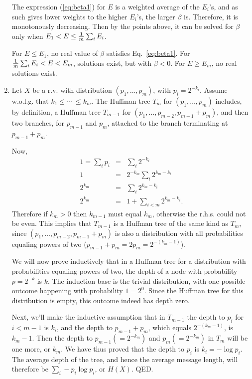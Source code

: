 \documentclass[11pt]{article} \usepackage{amssymb}
\begin{document}
\begin{enumerate}
The expression (\ref{eq:beta1}) for $E$ is a weighted average of the $E_i$'s, and as such
gives lower weights to the higher $E_i$'s, the larger $\beta$ is. Therefore,
it is monotonously decreasing. Then by the points above, it can be 
solved for $\beta$ only when $E_1<E\leq {1\over m}\sum_iE_i$.

For $E\leq E_1$, no real value of $\beta$ satisfies Eq.~\ref{eq:beta1}. 
For ${1\over m}\sum_iE_i<E<E_m$, solutions exist, but with $\beta<0$. For $E\geq E_m$, no real 
solutions exist.

\item
Let $X$ be a r.v. with distribution $(p_1,\ldots,p_m)$, with $p_i=2^{-k_i}$.
Assume w.o.l.g. that $k_1\leq \cdots\ \leq k_m$. 
The Huffman tree $T_m$ for $(p_1,\ldots,p_m)$ includes, by definition,  
a Huffman tree $T_{m-1}$ for $(p_1,\ldots,p_{m-2},p_{m-1}+p_{m})$, and then 
two branches, for $p_{m-1}$ and $p_m$, attached to the branch terminating
at $p_{m-1}+p_m$. 

Now, 
\begin{eqnarray*}
1=\sum_ip_i&=&\sum_i2^{-k_i}
\\ 1&=&2^{-k_m}\sum_i2^{k_m-k_i}
\\ 2^{k_m}&=&\sum_i2^{k_m-k_i}
\\ 2^{k_m}&=&1+\sum_{i<m}2^{k_m-k_i}.
\end{eqnarray*}
Therefore if $k_m>0$ then $k_{m-1}$ must equal $k_m$, otherwise the r.h.s. could not be even.
This implies that $T_{m-1}$ is a Huffman tree of the same kind as
$T_m$, since $(p_1,\ldots,p_{m-2},p_{m-1}+p_{m})$ is also a distribution
with all probabilities equaling powers of two ($p_{m-1}+p_m=2p_m=2^{-(k_m-1)}$).

We will now prove inductively that in a Huffman tree for a distribution with
probabilities equaling powers of two, the depth of a node with probability
$p=2^{-k}$ is $k$. The induction base is the trivial distribution, with one
possible outcome happening with probability $1=2^0$. Since the Huffman tree
for this distribution is empty, this outcome indeed has depth zero. 

Next, we'll make the inductive assumption 
that in $T_{m-1}$ the depth to $p_i$ for $i<m-1$ is $k_i$, and
the depth to $p_{m-1}+p_m$, which equals $2^{-(k_m-1)}$, is $k_m-1$. Then the depth to
$p_{m-1}(=2^{-k_m})$ and $p_m(=2^{-k_m})$ in $T_m$ will be one more, or $k_m$. 
We have thus
proved that the depth to $p_i$ is $k_i=-\log p_i$. The average depth of the
tree, and hence the average message length, will therefore 
be $\sum_i-p_i\log p_i$, or $H(X)$. QED.


\end{enumerate}
\end{document}
